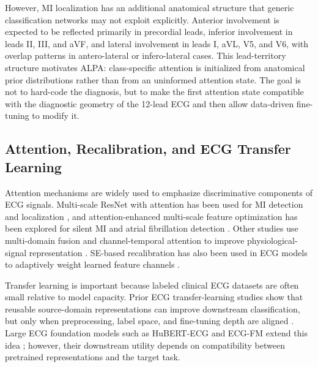 \documentclass[a4paper,fleqn]{cas-dc}
\begin{document}
However, MI localization has an additional anatomical structure that generic classification networks
may not exploit explicitly. Anterior involvement is expected to be reflected primarily in precordial
leads, inferior involvement in leads II, III, and aVF, and lateral involvement in leads I, aVL, V5,
and V6, with overlap patterns in antero-lateral or infero-lateral cases. This lead-territory
structure motivates ALPA: class-specific attention is initialized from anatomical prior
distributions rather than from an uninformed attention state. The goal is not to hard-code the
diagnosis, but to make the first attention state compatible with the diagnostic geometry of the
12-lead ECG and then allow data-driven fine-tuning to modify it.

\subsection{Attention, Recalibration, and ECG Transfer Learning}
Attention mechanisms are widely used to emphasize discriminative components of ECG signals.
Multi-scale ResNet with attention has been used for MI detection and localization
\cite{Cao2022FrontPhysiol_MSResNet_Attn_MI}, and attention-enhanced multi-scale feature optimization
has been explored for silent MI and atrial fibrillation detection
\cite{Cheng2024AIMLR_Attn_MultiScale_SilentMI_AF}. Other studies use multi-domain fusion and
channel-temporal attention to improve physiological-signal representation
\cite{Chen2025Biosensors_MDF_Fusion_MI,LimKim2025ApplSci_SpikeCAN}. SE-based recalibration has also
been used in ECG models to adaptively weight learned feature channels
\cite{Sun2024Sensors_CNNLSTMSE,QuFu2025JSMU_ResLSTM_TemporalSE}.

Transfer learning is important because labeled clinical ECG datasets are often small relative to
model capacity. Prior ECG transfer-learning studies show that reusable source-domain representations
can improve downstream classification, but only when preprocessing, label space, and fine-tuning
depth are aligned
\cite{WeimannConrad2021SciRep_TL_ECG,JangKimYoon2021HIR_TL_ECG,ChuiGuptaZhaoMalibariAryaAlhalabiRuiz2022Bioengineering_DistantTL_ECG,LopesBleijendaalRamosVerstraelenAminWildePintoDeMolMarquering2021CBM_TL_PLN,NguyenDo2025PLOSone_TL_ECG_Effective}.
Large ECG foundation models such as HuBERT-ECG and ECG-FM extend this idea
\cite{HuBERTECG2024,McKeen2024ECGFM}; however, their downstream utility depends on compatibility
between pretrained representations and the target task.
\end{document}
